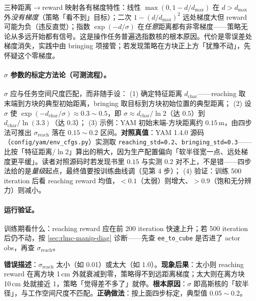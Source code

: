 \begin{insight}[为什么是指数核而非线性/二次]\label{ins:rlmc-manip-kernel}
三种距离$\to$reward 映射各有梯度特性：线性 $\max(0,1-d/d_{\max})$ 在 $d>d_{\max}$ 外\emph{没有梯度}（策略「看不到」目标）；二次 $1-(d/d_{\max})^2$ 远处梯度大但 reward 可能为负（违反直觉）；指数 $\exp(-d/\sigma)$ 在\emph{任意}距离都有非零梯度——策略无论从多远开始都有信号。这是操作任务普遍选指数核的根本原因。代价是零误差处梯度消失，实践中由 bringing 项接管；若发现策略在方块正上方「犹豫不动」，先怀疑这个零梯度。
\end{insight}

\paragraph{$\sigma$ 参数的标定方法论（可测流程）。}$\sigma$ 应与任务空间尺度匹配，而非随手设：
(1) 确定特征距离 $d_{\text{char}}$——reaching 取末端到方块的典型初始距离，bringing 取目标到方块初始位置的典型距离；
(2) 设 $\sigma$ 使 $\exp(-d_{\text{char}}/\sigma)\approx 0.3\sim 0.5$，即 $\sigma\approx d_{\text{char}}/\ln 2$（达 $0.5$）到 $d_{\text{char}}/\ln(3.3)$（达 $0.3$）；
(3) 示例：YAM 初始末端-方块距离约 $0.15$\,m，由四步法可推出 $\sigma_{\text{reach}}$ 落在 $0.15\sim0.2$ 区间。\textbf{对照真值}：YAM 1.4.0 源码（\verb|config/yam/env_cfgs.py|）实测取 \verb|reaching_std=0.2|、\verb|bringing_std=0.3|——比按「特征距离/$\ln 2$」算出的稍大，因为生产配置偏向「软半径宽一点、远处梯度更平缓」。读者对照源码时若发现书里 $0.15$ 与实测 $0.2$ 对不上，不是错——四步法给的是\emph{量级}起点，最终值要按训练曲线调（见第 4 步）；
(4) 验证：训练 500 iteration 后看 reaching reward 均值，$<0.1$（太弱）则增大、$>0.9$（饱和无分辨力）则减小。

\paragraph{运行验证。}训练期看什么：reaching reward 应在前 200 iteration 快速上升；若 500 iteration 后仍不动，按 \cref{sec:rlmc-manip-diag} 诊断——先查 \verb|ee_to_cube| 是否进了 actor obs，再查 $\sigma_{\text{reach}}$。

\begin{pitfall}
\textbf{错误描述}：$\sigma_{\text{reach}}$ 太小（如 0.01）或太大（如 1.0）。\textbf{现象后果}：太小则 reaching reward 在离方块 1\,cm 外就衰减到零，策略得不到远距离梯度；太大则在离方块 10\,cm 处就接近 1，策略「觉得差不多了」就停。\textbf{根本原因}：$\sigma$ 即高斯核的「软半径」，与工作空间尺度不匹配。\textbf{正确做法}：按上面四步标定，典型值 $0.05\sim 0.2$。
\end{pitfall}

